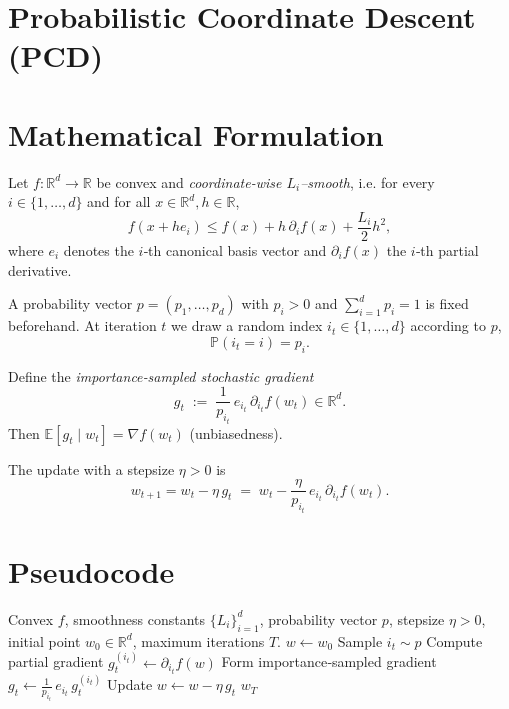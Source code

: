 \documentclass{article}
\newcommand{\E}{\mathbb{E}}
\newcommand{\R}{\mathbb{R}}
\newcommand{\grad}{\nabla}
\begin{document}
\section*{Probabilistic Coordinate Descent (PCD)}

\section*{Mathematical Formulation}
Let $f:\R^{d}\rightarrow\R$ be convex and \emph{coordinate‑wise $L_i$–smooth}, i.e. for every $i\in\{1,\dots ,d\}$ and for all $x\in\R^{d},h\in\R$,
\[
f(x+he_i)\le f(x)+h\,\partial_i f(x)+\frac{L_i}{2}h^{2},
\tag{1}
\]
where $e_i$ denotes the $i$‑th canonical basis vector and $\partial_i f(x)$ the $i$‑th partial derivative.

A probability vector $p=(p_1,\dots ,p_d)$ with $p_i>0$ and $\sum_{i=1}^{d}p_i=1$ is fixed beforehand.  
At iteration $t$ we draw a random index $i_t\in\{1,\dots ,d\}$ according to $p$,
\[
\mathbb{P}(i_t=i)=p_i .
\tag{2}
\]

Define the \emph{importance‑sampled stochastic gradient}
\[
g_t\;:=\;\frac{1}{p_{i_t}}\,e_{i_t}\,\partial_{i_t}f(w_t)\in\R^{d}.
\tag{3}
\]
Then $\E[g_t\mid w_t]=\grad f(w_t)$ (unbiasedness).

The update with a stepsize $\eta>0$ is
\[
w_{t+1}=w_t-\eta\, g_t
\;=\;
w_t-\frac{\eta}{p_{i_t}}\,e_{i_t}\,\partial_{i_t}f(w_t).
\tag{4}
\]

\section*{Pseudocode}
\begin{algorithm}[H]
\caption{Probabilistic Coordinate Descent (PCD)}
\begin{algorithmic}[1]
\Require Convex $f$, smoothness constants $\{L_i\}_{i=1}^d$, probability vector $p$, stepsize $\eta>0$, 
initial point $w_0\in\R^d$, maximum iterations $T$.
\State $w\gets w_0$
    \State Sample $i_t\sim p$ 
    \State Compute partial gradient $g_{t}^{(i_t)}\gets \partial_{i_t}f(w)$
    \State Form importance‑sampled gradient 
    $g_t\gets \frac{1}{p_{i_t}}\,e_{i_t}\,g_{t}^{(i_t)}$
    \State Update $w\gets w-\eta\, g_t$
\EndFor
\State \Return $w_T$
\end{algorithmic}
\end{algorithm}
\end{document}
